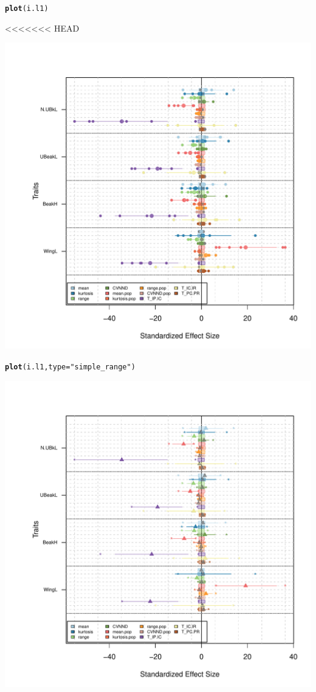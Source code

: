 \documentclass[12pt]{article}\usepackage[]{graphicx}\usepackage[]{color}
\makeatletter
\def\maxwidth{ %
  \ifdim\Gin@nat@width>\linewidth
    \linewidth
  \else
    \Gin@nat@width
  \fi
}
\newcommand{\hlstr}[1]{\textcolor[rgb]{0.192,0.494,0.8}{#1}}%
\newcommand{\hlstd}[1]{\textcolor[rgb]{0.345,0.345,0.345}{#1}}%
\newcommand{\hlkwc}[1]{\textcolor[rgb]{0.333,0.667,0.333}{#1}}%
\newcommand{\hlkwd}[1]{\textcolor[rgb]{0.737,0.353,0.396}{\textbf{#1}}}%
\newenvironment{kframe}{%
 \def\at@end@of@kframe{}%
 \ifinner\ifhmode%
  \def\at@end@of@kframe{\end{minipage}}%
  \begin{minipage}{\columnwidth}%
 \fi\fi%
 \def\FrameCommand##1{\hskip\@totalleftmargin \hskip-\fboxsep
 \colorbox{shadecolor}{##1}\hskip-\fboxsep
     \hskip-\linewidth \hskip-\@totalleftmargin \hskip\columnwidth}%
 \MakeFramed {\advance\hsize-\width
   \@totalleftmargin\z@ \linewidth\hsize
   \@setminipage}}%
 {\par\unskip\endMakeFramed%
 \at@end@of@kframe}
\newenvironment{knitrout}{}{} %
\makeatother
\begin{document}
\begin{knitrout}
\color{fgcolor}\begin{kframe}
\begin{alltt}
\hlkwd{plot}\hlstd{(i.l1)}
\end{alltt}
<<<<<<< HEAD
\end{kframe}
\includegraphics[width=\maxwidth]{figure/unnamed-chunk-511} 
\begin{kframe}\begin{alltt}
\hlkwd{plot}\hlstd{(i.l1,}\hlkwc{type} \hlstd{=} \hlstr{"simple_range"}\hlstd{)}
\end{alltt}
\end{kframe}
\includegraphics[width=\maxwidth]{figure/unnamed-chunk-512} 

\end{knitrout}
\end{document}
